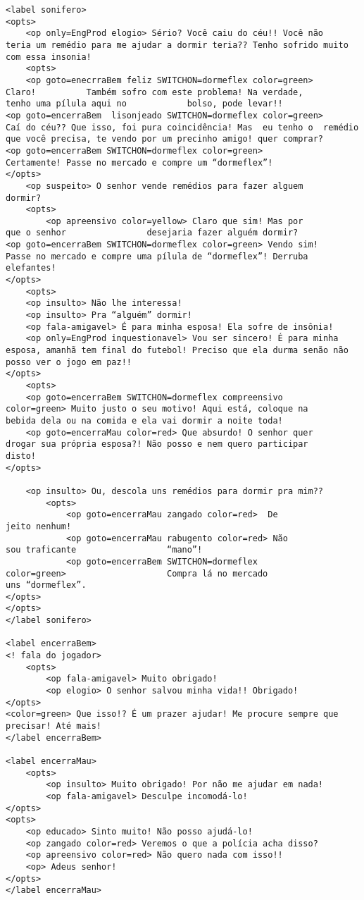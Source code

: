 {\begin{verbatim}
<label sonifero>
<opts>
	<op only=EngProd elogio> Sério? Você caiu do céu!! Você não
teria um remédio para me ajudar a dormir teria?? Tenho sofrido muito
com essa insonia!
	<opts>
	<op goto=enecrraBem feliz SWITCHON=dormeflex color=green>
Claro! 			Também sofro com este problema! Na verdade,
tenho uma pílula aqui no 			bolso, pode levar!!
<op goto=encerraBem  lisonjeado SWITCHON=dormeflex color=green>
Caí do céu?? Que isso, foi pura coincidência! Mas  eu tenho o  remédio
que você precisa, te vendo por um precinho amigo! quer comprar?
<op goto=encerraBem SWITCHON=dormeflex color=green>
Certamente! Passe no mercado e compre um “dormeflex”!
</opts>
	<op suspeito> O senhor vende remédios para fazer alguem
dormir?
	<opts>
		<op apreensivo color=yellow> Claro que sim! Mas por
que o senhor 				desejaria fazer alguém dormir?
<op goto=encerraBem SWITCHON=dormeflex color=green> Vendo sim!
Passe no mercado e compre uma pílula de “dormeflex”! Derruba
elefantes!
</opts>
	<opts>
	<op insulto> Não lhe interessa!
	<op insulto> Pra “alguém” dormir!
	<op fala-amigavel> É para minha esposa! Ela sofre de insônia!
	<op only=EngProd inquestionavel> Vou ser sincero! É para minha
esposa, amanhã tem final do futebol! Preciso que ela durma senão não
posso ver o jogo em paz!!
</opts>
	<opts>
	<op goto=encerraBem SWITCHON=dormeflex compreensivo
color=green> Muito justo o seu motivo! Aqui está, coloque na
bebida dela ou na comida e ela vai dormir a noite toda!
	<op goto=encerraMau color=red> Que absurdo! O senhor quer
drogar sua própria esposa?! Não posso e nem quero participar
disto!
</opts>
	
	<op insulto> Ou, descola uns remédios para dormir pra mim??
		<opts>
			<op goto=encerraMau zangado color=red>  De
jeito nenhum!
			<op goto=encerraMau rabugento color=red> Não
sou traficante 					“mano”!
			<op goto=encerraBem SWITCHON=dormeflex
color=green> 					Compra lá no mercado
uns “dormeflex”.
</opts>
</opts>
</label sonifero>

<label encerraBem>
<! fala do jogador>
	<opts>
		<op fala-amigavel> Muito obrigado!
		<op elogio> O senhor salvou minha vida!! Obrigado!
</opts>
<color=green> Que isso!? É um prazer ajudar! Me procure sempre que
precisar! Até mais!
</label encerraBem>

<label encerraMau>
	<opts>
		<op insulto> Muito obrigado! Por não me ajudar em nada!
		<op fala-amigavel> Desculpe incomodá-lo!
</opts>
<opts>
	<op educado> Sinto muito! Não posso ajudá-lo!
	<op zangado color=red> Veremos o que a polícia acha disso?
	<op apreensivo color=red> Não quero nada com isso!!
	<op> Adeus senhor!
</opts>
</label encerraMau>
\end{verbatim}
}
